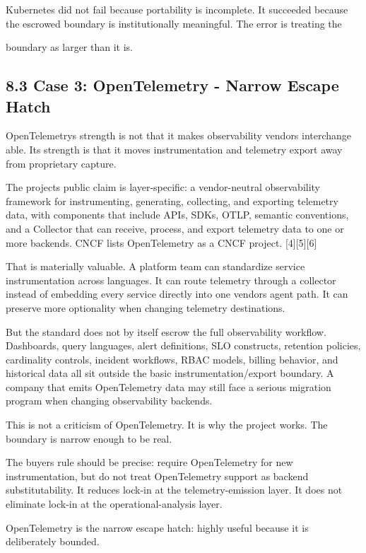 \documentclass[11pt]{article}
\begin{document}
Kubernetes did not fail because portability is incomplete. It succeeded because the escrowed boundary is institutionally meaningful. The error is treating the

boundary as larger than it is.

\subsection{8.3 Case 3: OpenTelemetry - Narrow Escape Hatch}\label{case-3-opentelemetry-narrow-escape-hatch}

OpenTelemetry\textquotesingle s strength is not that it makes observability vendors interchange able. Its strength is that it moves instrumentation and telemetry export away from proprietary capture.

The project\textquotesingle s public claim is layer-specific: a vendor-neutral observability framework for instrumenting, generating, collecting, and exporting telemetry data, with components that include APIs, SDKs, OTLP, semantic conventions, and a Collector that can receive, process, and export telemetry data to one or more backends. CNCF lists OpenTelemetry as a CNCF project. {[}4{]}{[}5{]}{[}6{]}

That is materially valuable. A platform team can standardize service instrumentation across languages. It can route telemetry through a collector instead of embedding every service directly into one vendor\textquotesingle s agent path. It can preserve more optionality when changing telemetry destinations.

But the standard does not by itself escrow the full observability workflow. Dashboards, query languages, alert definitions, SLO constructs, retention policies, cardinality controls, incident workflows, RBAC models, billing behavior, and historical data all sit outside the basic instrumentation/export boundary. A company that emits OpenTelemetry data may still face a serious migration program when changing observability backends.

This is not a criticism of OpenTelemetry. It is why the project works. The boundary is narrow enough to be real.

The buyer\textquotesingle s rule should be precise: require OpenTelemetry for new instrumentation, but do not treat OpenTelemetry support as backend substitutability. It reduces lock-in at the telemetry-emission layer. It does not eliminate lock-in at the operational-analysis layer.

OpenTelemetry is the narrow escape hatch: highly useful because it is deliberately bounded.
\end{document}
